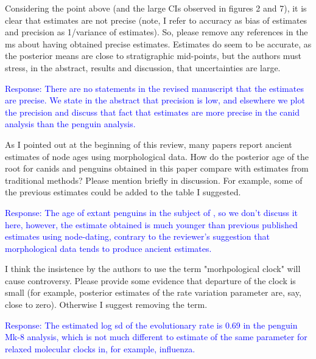 \documentclass[11pt]{article}
\newcommand{\response}[1]{\medskip{}\textcolor{blue}{{Response: #1}}\medskip{}}
\begin{document}
Considering the point above (and the large CIs observed in figures 2 and 7), it is clear that estimates are not precise (note, I refer to accuracy as bias of estimates and precision as 1/variance of estimates). So, please remove any references in the ms about having obtained precise estimates. Estimates do seem to be accurate, as the posterior means are close to stratigraphic mid-points, but the authors must stress, in the abstract, results and discussion, that uncertainties are large.

\response{There are no statements in the revised manuscript that the estimates are precise. We state in the abstract that precision is low, and elsewhere we plot the precision and discuss that fact that estimates are more precise in the canid analysis than the penguin analysis.}

As I pointed out at the beginning of this review, many papers report ancient estimates of node ages using morphological data. How do the posterior age of the root for canids and penguins obtained in this paper compare with estimates from traditional methods? Please mention briefly in discussion. For example, some of the previous estimates could be added to the table I suggested.

\response{The age of extant penguins in the subject of \cite{gavryushkina2015bayesian}, so we don't discuss it here, however, the estimate obtained is much younger than previous published estimates using node-dating, contrary to the reviewer's suggestion that morphological data tends to produce ancient estimates.}

I think the insistence by the authors to use the term "morhpological clock" will cause controversy. Please provide some evidence that departure of the clock is small (for example, posterior estimates of the rate variation parameter are, say, close to zero). Otherwise I suggest removing the term.

\response{The estimated log sd of the evolutionary rate is 0.69 in the penguin Mk-8 analysis, which is not much different to estimate of the same parameter for relaxed molecular clocks in, for example, influenza.}
\end{document}
